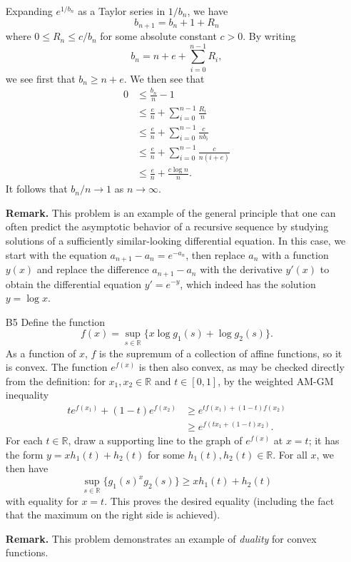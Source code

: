 \documentclass[amssymb,twocolumn,pra,10pt,aps]{revtex4-1}
\newcommand{\RR}{\mathbb{R}}
\begin{document}
\begin{itemize}
Expanding $e^{1/b_n}$ as a Taylor series in $1/b_n$, we have
\[
b_{n+1} = b_n + 1 + R_n
\]
where $0 \leq R_n \leq c/b_n$ for some absolute constant $c>0$.
By writing
\[
b_n = n+e + \sum_{i=0}^{n-1} R_i,
\]
we see first that $b_n \geq n+e$. We then see that
\begin{align*}
0 &\leq \frac{b_n}{n} - 1 \\
&\leq \frac{e}{n} + \sum_{i=0}^{n-1} \frac{R_i}{n}  \\
&\leq \frac{e}{n} + \sum_{i=0}^{n-1} \frac{c}{n b_i}  \\
&\leq \frac{e}{n} + \sum_{i=0}^{n-1} \frac{c}{n (i+e)}  \\
&\leq \frac{e}{n} + \frac{c \log n}{n}.
\end{align*}
It follows that $b_n/n \to 1$ as $n \to \infty$.

\noindent
\textbf{Remark.}
This problem is an example of the general principle that one can often predict the asymptotic behavior of a recursive
sequence by studying solutions of a sufficiently similar-looking differential equation. In this case, we
start with the equation $a_{n+1} - a_n = e^{-a_n}$, then replace $a_n$ with a function $y(x)$
and replace the difference $a_{n+1} - a_n$ with the derivative $y'(x)$ to obtain the differential equation
$y' = e^{-y}$, which indeed has the solution $y = \log x$.

\item[B5]
Define the function
\[
f(x) = \sup_{s \in \RR} \{x \log g_1(s) + \log g_2(s)\}.
\]
As a function of $x$, $f$ is the supremum of a collection of affine functions, so it is convex.
The function $e^{f(x)}$ is then also convex, as may be checked directly from the definition:
for $x_1, x_2 \in \RR$ and $t \in [0,1]$, by the weighted AM-GM inequality
\begin{align*}
t e^{f(x_1)} + (1-t) e^{f(x_2)}&\geq e^{t f(x_1) + (1-t)f(x_2)} \\
&\geq e^{f(t x_1 + (1-t)x_2)}.
\end{align*}
For each $t \in \RR$, draw a supporting line to the graph of $e^{f(x)}$ at $x=t$;
it has the form $y = x h_1(t) + h_2(t)$ for some $h_1(t), h_2(t) \in \RR$. For all $x$, we then have
\[
\sup_{s \in \RR} \{g_1(s)^x g_2(s) \} \geq x h_1(t) + h_2(t)
\]
with equality for $x = t$. This proves the desired equality (including the fact that the maximum on the right side is achieved).

\noindent
\textbf{Remark.}
This problem demonstrates an example of \emph{duality} for convex functions.


\end{itemize}
\end{document}
